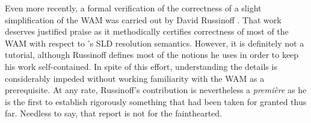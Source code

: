 Even more recently, a formal verification of the correctness of a slight
simplification of the WAM was carried out by David Russinoff \cite{Rus89}. That
work deserves justified praise as it methodically certifies correctness of most
of the WAM with respect to \prolog’s SLD resolution semantics. However, it is
definitely not a tutorial, although Russinoff defines most of the notions he
uses in order to keep his work self-contained. In spite of this effort,
understanding the details is considerably impeded without working familiarity
with the WAM as a prerequisite. At any rate, Russinoff’s contribution is
nevertheless a \emph{premi\`ere} as he is the first to establish rigorously
something that had been taken for granted thus far. Needless to say, that report
is not for the fainthearted.
 
\secdown



\secup
\secup